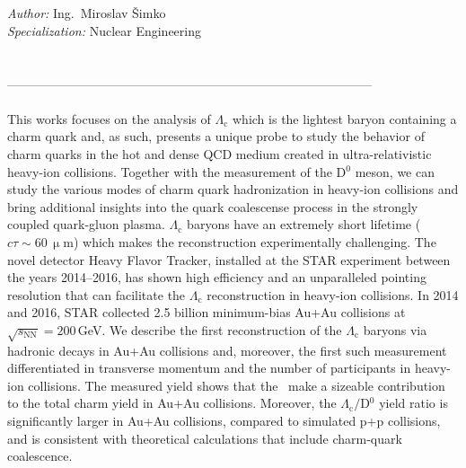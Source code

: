 \pagestyle{fancy}
\mbox{}
\newpage

\\
{\bf \engtitle}\\

\noindent
{\it Author:}        Ing.\ Miroslav Šimko \\

\noindent
{\it Specialization:}     Nuclear Engineering\\


 \skolitel \\

 \konzultant\\  
--------------------------------------------------------------------------------------- \\

 \\
\noindent  This works focuses on the analysis of $\Lambda_\mathrm{c}$ which is the lightest baryon containing a charm quark and, as such, presents a unique probe to study
the behavior of charm quarks in the hot and dense QCD medium created in ultra-relativistic heavy-ion collisions. Together with the measurement of the D$^0$ meson,
we can study the various modes of charm quark hadronization in heavy-ion collisions and bring additional insights into the  quark coalescense process in the strongly coupled quark-gluon plasma.
$\Lambda_\mathrm{c}$ baryons have an extremely short lifetime ($c \tau \sim 60\,\upmu$m) which makes the reconstruction experimentally challenging. The novel detector Heavy Flavor Tracker, installed at the STAR experiment between the years 2014--2016, has
shown high efficiency and an unparalleled pointing resolution that can facilitate the $\Lambda_\mathrm{c}$ reconstruction  in heavy-ion collisions. In 2014 and 2016, STAR collected 2.5 billion minimum-bias
Au+Au collisions at $\sqrt{s_\mathrm{NN}} = 200\,$GeV\@.
We describe the first reconstruction of the $\Lambda_\mathrm{c}$ baryons via hadronic decays in Au+Au collisions and, moreover, the first such measurement differentiated in transverse momentum and the number of participants in heavy-ion collisions. The measured yield shows that the \Lambdac\ make a sizeable contribution to the total charm yield in Au+Au collisions. Moreover, the $\Lambda_\mathrm{c}/$D$^0$ yield ratio is significantly larger in Au+Au collisions, compared to simulated p+p collisions, and is consistent with theoretical calculations that include charm-quark coalescence.
\\

